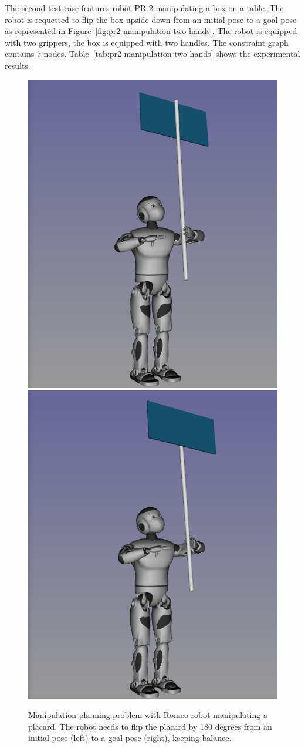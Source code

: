 The second test case features robot PR-2 manipulating a box on a table. The robot is requested to flip the box upside down from an initial pose to a goal pose as represented in Figure~\ref{fig:pr2-manipulation-two-hands}. The robot is equipped with two grippers, the box is equipped with two handles. The constraint graph contains 7 nodes. Table~\ref{tab:pr2-manipulation-two-hands} shows the experimental results.


\begin{figure}
  \begin{center}
    \includegraphics[width=.49\linewidth]{figures/romeo-placard-init.png}
    \includegraphics[width=.49\linewidth]{figures/romeo-placard-goal.png}    
  \end{center}
  \caption{Manipulation planning problem with Romeo robot manipulating a placard. The robot needs to flip the placard by 180 degrees from an initial pose (left) to a goal pose (right), keeping balance.}
  \label{fig:romeo-placard}
\end{figure}

